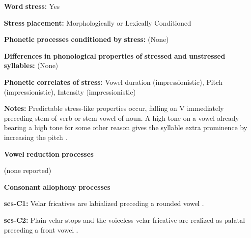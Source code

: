 \documentclass[output=paper]{langsci/langscibook}
\begin{document}
\begin{styleBody}
\textbf{Word} \textbf{stress:} Yes
\end{styleBody}

\begin{styleBody}
\textbf{Stress} \textbf{placement:} Morphologically or Lexically Conditioned
\end{styleBody}

\begin{styleBody}
\textbf{Phonetic} \textbf{processes} \textbf{conditioned} \textbf{by} \textbf{stress:} (None)
\end{styleBody}

\begin{styleBody}
\textbf{Differences} \textbf{in} \textbf{phonological} \textbf{properties} \textbf{of} \textbf{stressed} \textbf{and} \textbf{unstressed} \textbf{syllables:} (None)
\end{styleBody}

\begin{styleBody}
\textbf{Phonetic} \textbf{correlates} \textbf{of} \textbf{stress:} Vowel duration (impressionistic), Pitch (impressionistic), Intensity (impressionistic)
\end{styleBody}

\begin{styleBody}
\textbf{Notes:} Predictable stress-like properties occur, falling on V immediately preceding stem of verb or stem vowel of noun. A high tone on a vowel already bearing a high tone for some other reason gives the syllable extra prominence by increasing the pitch \citep[362]{Rice2005}.
\end{styleBody}

\begin{styleBody}
\textbf{Vowel} \textbf{reduction} \textbf{processes}
\end{styleBody}

\begin{styleBody}
(none reported)
\end{styleBody}

\begin{styleBody}
\textbf{Consonant} \textbf{allophony} \textbf{processes}
\end{styleBody}

\begin{styleBody}
\textbf{scs-C1:} Velar fricatives are labialized preceding a rounded vowel \citep[31]{Rice1989}.
\end{styleBody}

\begin{styleBody}
\textbf{scs-C2:} Plain velar stops and the voiceless velar fricative are realized as palatal preceding a front vowel \citep[31]{Rice1989}.
\end{styleBody}
\end{document}
